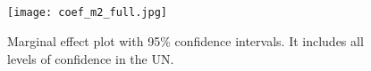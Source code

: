 \documentclass[12pt]{article}
\begin{document}
\clearpage

\begin{centering}
\section{}
\setcounter{table}{0}
\setcounter{figure}{0}
\end{centering}

\begin{centering}
%

\end{centering}


\clearpage

\begin{centering}
\section{}
\setcounter{table}{0}
\setcounter{figure}{0}
\end{centering}

\begin{figure}[h!]
\begin{centering}
\texttt{[image: coef\_m2\_full.jpg]}
\caption{\small Marginal effect plot with 95\% confidence intervals. It includes all levels of confidence in the UN.}
\label{figure 4}
\end{centering}
\end{figure}
\end{document}

